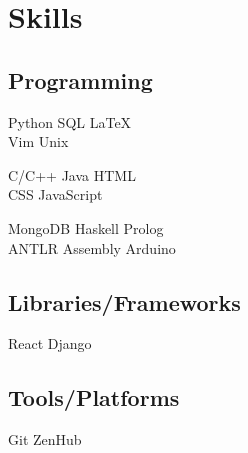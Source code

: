\documentclass[]{latex/resume}
\begin{document}
\hfill
\begin{minipage}[t]{0.25\textwidth} 


\section{Skills}
    \subsection{Programming}
        \sectionsep
            Python \textbullet{} SQL \textbullet{} \LaTeX \textbullet{} \\ Vim \textbullet{} Unix \\

        \sectionsep
        
            C/C++ \textbullet{} Java \textbullet{} HTML \textbullet{} \\ CSS \textbullet{} JavaScript \\
        
        \sectionsep
        
            MongoDB \textbullet{} Haskell \textbullet{}  Prolog \textbullet{} \\ ANTLR \textbullet{} Assembly \textbullet{} Arduino\\
    
    \sectionsep
    \sectionsep
    
    \subsection{Libraries/Frameworks}
        \sectionsep
        React \textbullet{} Django \\
    
    \sectionsep
    \sectionsep
    
    \subsection{Tools/Platforms}
        \sectionsep
        Git \textbullet{} ZenHub \\

\sectionsep



\end{minipage}
\end{document}
